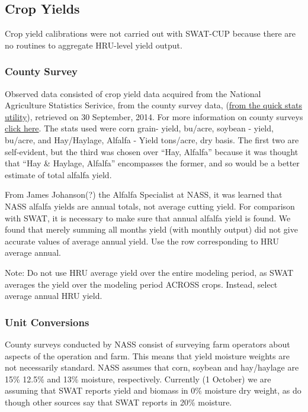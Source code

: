 \subsection{Crop Yields}
Crop yield calibrations were not carried out with SWAT-CUP because there are no routines to aggregate HRU-level yield output. 
	\subsubsection{County Survey}
	Observed data consisted of crop yield data acquired from the National Agriculture Statistics Serivice, from the county survey data, (\href{http://quickstats.nass.usda.gov/results/CD8890FD-566F-3F66-8C8A-CB932E358991}{from the quick stats utility}), retrieved on 30 September, 2014. For more information on county surveys \href{http://www.nass.usda.gov/Surveys/Guide_to_NASS_Surveys/County_Agricultural_Production/index.asp}{click here}. The stats used were corn grain- yield, bu/acre, soybean - yield, bu/acre, and Hay/Haylage, Alfalfa - Yield tons/acre, dry basis. The first two are self-evident, but the third was chosen over ``Hay, Alfalfa'' because it was thought that ``Hay \& Haylage, Alfalfa'' encompasses the former, and so would be a better estimate of total alfalfa yield.
	
	From James Johanson(?) the Alfalfa Specialist at NASS, it was learned that NASS alfalfa yields  are annual totals, not average cutting yield. For comparison with SWAT, it is necessary to make sure that annual alfalfa yield is found. We found that merely summing all months yield (with monthly output) did not give accurate values of average annual yield. Use the row corresponding to HRU average annual. 
	
	Note: Do not use HRU average yield over the entire modeling period, as SWAT averages the yield over the modeling period ACROSS crops. Instead, select average annual HRU yield. 

	\subsubsection{Unit Conversions}
	County surveys conducted by NASS consist of surveying farm operators about aspects of the operation and farm. This means that yield moisture weights are not necessarily standard. NASS assumes that corn, soybean and hay/haylage are 15\% 12.5\% and 13\% moisture, respectively. 
	Currently (1 October) we are assuming that SWAT reports yield and biomass in 0\% moisture dry weight, as do \citet{almendinger_contructingsunrise_2010} though other sources \citep{srinivasan_swatungauged_2010} say that SWAT reports in 20\% moisture. 

